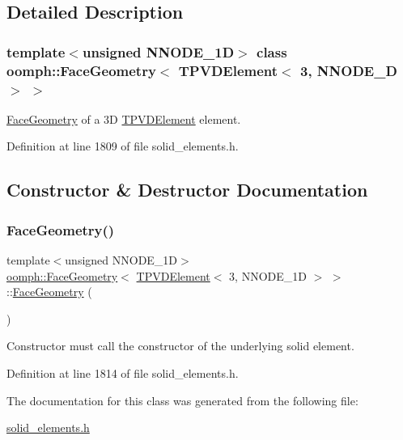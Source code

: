 \subsection{Detailed Description}
\subsubsection*{template$<$unsigned N\+N\+O\+D\+E\+\_\+1D$>$\newline
class oomph\+::\+Face\+Geometry$<$ T\+P\+V\+D\+Element$<$ 3, N\+N\+O\+D\+E\+\_\+D $>$ $>$}

\hyperlink{classoomph_1_1FaceGeometry}{Face\+Geometry} of a 3D \hyperlink{classoomph_1_1TPVDElement}{T\+P\+V\+D\+Element} element. 

Definition at line 1809 of file solid\+\_\+elements.\+h.



\subsection{Constructor \& Destructor Documentation}
\mbox{\label{classoomph_1_1FaceGeometry_3_01TPVDElement_3_013_00_01NNODE__1D_01_4_01_4_a8344ec652edb704ef7fc4d691cd20a93}} 
\subsubsection{\texorpdfstring{Face\+Geometry()}{FaceGeometry()}}
{\footnotesize\ttfamily template$<$unsigned N\+N\+O\+D\+E\+\_\+1D$>$ \\
\hyperlink{classoomph_1_1FaceGeometry}{oomph\+::\+Face\+Geometry}$<$ \hyperlink{classoomph_1_1TPVDElement}{T\+P\+V\+D\+Element}$<$ 3, N\+N\+O\+D\+E\+\_\+1D $>$ $>$\+::\hyperlink{classoomph_1_1FaceGeometry}{Face\+Geometry} (\begin{DoxyParamCaption}{ }\end{DoxyParamCaption})\hspace{0.3cm}{\ttfamily [inline]}}



Constructor must call the constructor of the underlying solid element. 



Definition at line 1814 of file solid\+\_\+elements.\+h.



The documentation for this class was generated from the following file\+:\begin{DoxyCompactItemize}
\item 
\hyperlink{solid__elements_8h}{solid\+\_\+elements.\+h}\end{DoxyCompactItemize}
